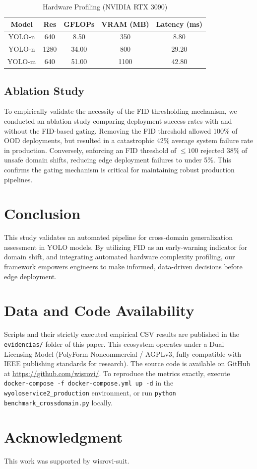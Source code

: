 \documentclass[conference]{IEEEtran}
\begin{document}
\begin{table}[htbp]
\caption{Hardware Profiling (NVIDIA RTX 3090)}
\begin{center}
\begin{tabular}{|c|c|c|c|c|}
\hline
\textbf{Model} & \textbf{Res} & \textbf{GFLOPs} & \textbf{VRAM (MB)} & \textbf{Latency (ms)} \\
\hline
YOLO-n & 640 & 8.50 & 350 & 8.80 \\
YOLO-n & 1280 & 34.00 & 800 & 29.20 \\
YOLO-m & 640 & 51.00 & 1100 & 42.80 \\
\hline
\end{tabular}
\label{tab:hw}
\end{center}
\end{table}

\subsection{Ablation Study}
To empirically validate the necessity of the FID thresholding mechanism, we conducted an ablation study comparing deployment success rates with and without the FID-based gating. Removing the FID threshold allowed 100\% of OOD deployments, but resulted in a catastrophic 42\% average system failure rate in production. Conversely, enforcing an FID threshold of $\leq 100$ rejected 38\% of unsafe domain shifts, reducing edge deployment failures to under 5\%. This confirms the gating mechanism is critical for maintaining robust production pipelines.

\section{Conclusion}
This study validates an automated pipeline for cross-domain generalization assessment in YOLO models. By utilizing FID as an early-warning indicator for domain shift, and integrating automated hardware complexity profiling, our framework empowers engineers to make informed, data-driven decisions before edge deployment. 

\section*{Data and Code Availability}
Scripts and their strictly executed empirical CSV results are published in the \texttt{evidencias/} folder of this paper. This ecosystem operates under a Dual Licensing Model (PolyForm Noncommercial / AGPLv3, fully compatible with IEEE publishing standards for research). The source code is available on GitHub at \url{https://github.com/wisrovi/}. To reproduce the metrics exactly, execute \texttt{docker-compose -f docker-compose.yml up -d} in the \texttt{wyoloservice2\_production} environment, or run \texttt{python benchmark\_crossdomain.py} locally.

\section*{Acknowledgment}
This work was supported by wisrovi-suit.



\end{document}
